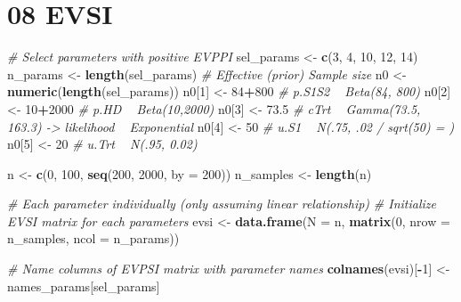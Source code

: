 \documentclass[
]{article}
\newenvironment{Shaded}{\begin{snugshade}}{\end{snugshade}}
\newcommand{\CommentTok}[1]{\textcolor[rgb]{0.56,0.35,0.01}{\textit{#1}}}
\newcommand{\DataTypeTok}[1]{\textcolor[rgb]{0.13,0.29,0.53}{#1}}
\newcommand{\DecValTok}[1]{\textcolor[rgb]{0.00,0.00,0.81}{#1}}
\newcommand{\FloatTok}[1]{\textcolor[rgb]{0.00,0.00,0.81}{#1}}
\newcommand{\KeywordTok}[1]{\textcolor[rgb]{0.13,0.29,0.53}{\textbf{#1}}}
\newcommand{\NormalTok}[1]{#1}
\newcommand{\OperatorTok}[1]{\textcolor[rgb]{0.81,0.36,0.00}{\textbf{#1}}}
\newcommand{\StringTok}[1]{\textcolor[rgb]{0.31,0.60,0.02}{#1}}
\begin{document}
\hypertarget{evsi}{%
\section{08 EVSI}\label{evsi}}

\begin{Shaded}
\begin{Highlighting}[]
\CommentTok{# Select parameters with positive EVPPI}
\NormalTok{sel_params <-}\StringTok{ }\KeywordTok{c}\NormalTok{(}\DecValTok{3}\NormalTok{, }\DecValTok{4}\NormalTok{, }\DecValTok{10}\NormalTok{, }\DecValTok{12}\NormalTok{, }\DecValTok{14}\NormalTok{)}
\NormalTok{n_params <-}\StringTok{ }\KeywordTok{length}\NormalTok{(sel_params)}
\CommentTok{# Effective (prior) Sample size}
\NormalTok{n0 <-}\StringTok{ }\KeywordTok{numeric}\NormalTok{(}\KeywordTok{length}\NormalTok{(sel_params))}
\NormalTok{n0[}\DecValTok{1}\NormalTok{] <-}\StringTok{ }\DecValTok{84}\OperatorTok{+}\DecValTok{800}    \CommentTok{# p.S1S2 ~ Beta(84, 800)}
\NormalTok{n0[}\DecValTok{2}\NormalTok{] <-}\StringTok{ }\DecValTok{10}\OperatorTok{+}\DecValTok{2000}   \CommentTok{# p.HD ~ Beta(10,2000)}
\NormalTok{n0[}\DecValTok{3}\NormalTok{] <-}\StringTok{ }\FloatTok{73.5}      \CommentTok{# cTrt ~ Gamma(73.5, 163.3) -> likelihood ~ Exponential}
\NormalTok{n0[}\DecValTok{4}\NormalTok{] <-}\StringTok{ }\DecValTok{50}        \CommentTok{# u.S1 ~ N(.75, .02 / sqrt(50) = )}
\NormalTok{n0[}\DecValTok{5}\NormalTok{] <-}\StringTok{ }\DecValTok{20}        \CommentTok{# u.Trt ~ N(.95, 0.02)}

\NormalTok{n <-}\StringTok{ }\KeywordTok{c}\NormalTok{(}\DecValTok{0}\NormalTok{, }\DecValTok{100}\NormalTok{, }\KeywordTok{seq}\NormalTok{(}\DecValTok{200}\NormalTok{, }\DecValTok{2000}\NormalTok{, }\DataTypeTok{by =} \DecValTok{200}\NormalTok{))}
\NormalTok{n_samples <-}\StringTok{ }\KeywordTok{length}\NormalTok{(n)}

\CommentTok{# Each parameter individually (only assuming linear relationship)}
\CommentTok{# Initialize EVSI matrix for each parameters}
\NormalTok{evsi <-}\StringTok{ }\KeywordTok{data.frame}\NormalTok{(}\DataTypeTok{N =}\NormalTok{ n, }\KeywordTok{matrix}\NormalTok{(}\DecValTok{0}\NormalTok{, }\DataTypeTok{nrow =}\NormalTok{ n_samples, }\DataTypeTok{ncol =}\NormalTok{ n_params))}

\CommentTok{# Name columns of EVPSI matrix with parameter names}
\KeywordTok{colnames}\NormalTok{(evsi)[}\OperatorTok{-}\DecValTok{1}\NormalTok{] <-}\StringTok{ }\NormalTok{names_params[sel_params]}


\end{Highlighting}
\end{Shaded}
\end{document}
